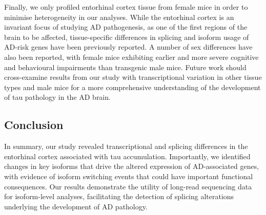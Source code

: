 Finally, we only profiled entorhinal cortex tissue from female mice in order to minimise heterogeneity in our analyses. While the entorhinal cortex is an invariant focus of studying AD pathogenesis, as one of the first regions of the brain to be affected, tissue-specific differences in splicing and isoform usage of AD-risk genes have been previously reported\cite{Monti2021}. A number of sex differences have also been reported, with female mice exhibiting earlier and more severe cognitive and behavioural impairments than transgenic male mice\cite{M2011}. Future work should cross-examine results from our study with transcriptional variation in other tissue types and male mice for a more comprehensive understanding of the development of tau pathology in the AD brain. 

\subsection{Conclusion}
In summary, our study revealed transcriptional and splicing differences in the entorhinal cortex associated with tau accumulation. Importantly, we identified changes in key isoforms that drive the altered expression of AD-associated genes, with evidence of isoform switching events that could have important functional consequences. Our results demonstrate the utility of long-read sequencing data for isoform-level analyses, facilitating the detection of splicing alterations underlying the development of AD pathology. 
